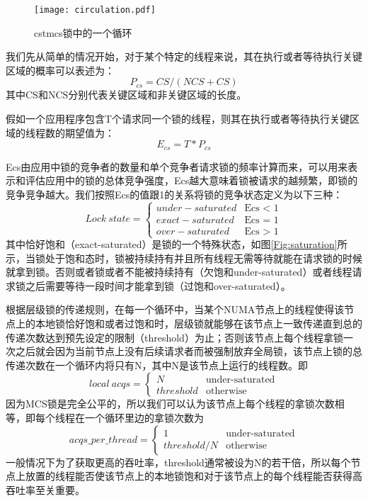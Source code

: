 \begin{figure}[t]
	\centering
	\texttt{[image: circulation.pdf]}
	\caption{cstmcs锁中的一个循环}
	\label{Fig:circulation}
\end{figure}

我们先从简单的情况开始，对于某个特定的线程来说，其在执行或者等待执行关键区域的概率可以表述为：
\begin{equation}\label{Eq:pro}
     P_{cs} = CS / (NCS + CS)
\end{equation}
其中CS和NCS分别代表关键区域和非关键区域的长度。

假如一个应用程序包含T个请求同一个锁的线程，则其在执行或者等待执行关键区域的线程数的期望值为：
\begin{equation}\label{Eq:expectation}
     E_{cs} = T * P_{cs}
\end{equation}

Ecs由应用中锁的竞争者的数量和单个竞争者请求锁的频率计算而来，可以用来表示和评估应用中的锁的总体竞争强度，Ecs越大意味着锁被请求的越频繁，即锁的竞争竞争越大。我们按照Ecs的值跟1的关系将锁的竞争状态定义为以下三种：
\begin{equation}\label{Eq:state}
Lock\ state =
\begin{cases}
under-saturated &\text{Ecs < 1}\\
exact-saturated &\text{Ecs = 1}\\
over-saturated &\text{Ecs > 1}
\end{cases}
\end{equation}
其中恰好饱和（exact-saturated）是锁的一个特殊状态，如图\ref{Fig:saturation}所示，当锁处于饱和态时，锁被持续持有并且所有线程无需等待就能在请求锁的时候就拿到锁。否则或者锁或者不能被持续持有（欠饱和under-saturated）或者线程请求锁之后需要等待一段时间才能拿到锁（过饱和over-saturated）。

根据层级锁的传递规则，在每一个循环中，当某个NUMA节点上的线程使得该节点上的本地锁恰好饱和或者过饱和时，层级锁就能够在该节点上一致传递直到总的传递次数达到预先设定的限制（threshold）为止；否则该节点上每个线程拿锁一次之后就会因为当前节点上没有后续请求者而被强制放弃全局锁，该节点上锁的总传递次数在一个循环内将只有N，其中N是该节点上运行的线程数。即
\begin{equation}\label{Eq:localtrans}
local\ acqs =
\begin{cases}
N &\text{under-saturated}\\
threshold &\text{otherwise}
\end{cases}
\end{equation}
因为MCS锁是完全公平的，所以我们可以认为该节点上每个线程的拿锁次数相等，即每个线程在一个循环里边的拿锁次数为
\begin{equation}\label{Eq:per}
acqs\_per\_thread =
\begin{cases}
1 &\text{under-saturated}\\
threshold / N &\text{otherwise}
\end{cases}
\end{equation}
一般情况下为了获取更高的吞吐率，threshold通常被设为N的若干倍，所以每个节点上放置的线程能否使该节点上的本地锁饱和对于该节点上的每个线程能否获得高吞吐率至关重要。
